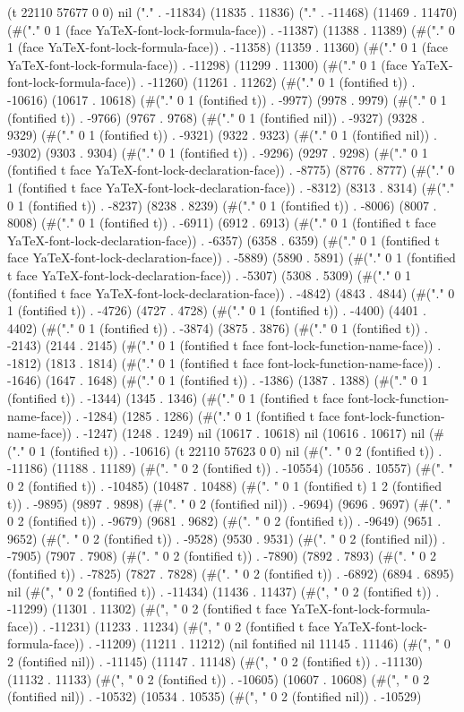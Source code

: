 (t 22110 57677 0 0) nil ("." . -11834) (11835 . 11836) ("." . -11468) (11469 . 11470) (#("." 0 1 (face YaTeX-font-lock-formula-face)) . -11387) (11388 . 11389) (#("." 0 1 (face YaTeX-font-lock-formula-face)) . -11358) (11359 . 11360) (#("." 0 1 (face YaTeX-font-lock-formula-face)) . -11298) (11299 . 11300) (#("." 0 1 (face YaTeX-font-lock-formula-face)) . -11260) (11261 . 11262) (#("." 0 1 (fontified t)) . -10616) (10617 . 10618) (#("." 0 1 (fontified t)) . -9977) (9978 . 9979) (#("." 0 1 (fontified t)) . -9766) (9767 . 9768) (#("." 0 1 (fontified nil)) . -9327) (9328 . 9329) (#("." 0 1 (fontified t)) . -9321) (9322 . 9323) (#("." 0 1 (fontified nil)) . -9302) (9303 . 9304) (#("." 0 1 (fontified t)) . -9296) (9297 . 9298) (#("." 0 1 (fontified t face YaTeX-font-lock-declaration-face)) . -8775) (8776 . 8777) (#("." 0 1 (fontified t face YaTeX-font-lock-declaration-face)) . -8312) (8313 . 8314) (#("." 0 1 (fontified t)) . -8237) (8238 . 8239) (#("." 0 1 (fontified t)) . -8006) (8007 . 8008) (#("." 0 1 (fontified t)) . -6911) (6912 . 6913) (#("." 0 1 (fontified t face YaTeX-font-lock-declaration-face)) . -6357) (6358 . 6359) (#("." 0 1 (fontified t face YaTeX-font-lock-declaration-face)) . -5889) (5890 . 5891) (#("." 0 1 (fontified t face YaTeX-font-lock-declaration-face)) . -5307) (5308 . 5309) (#("." 0 1 (fontified t face YaTeX-font-lock-declaration-face)) . -4842) (4843 . 4844) (#("." 0 1 (fontified t)) . -4726) (4727 . 4728) (#("." 0 1 (fontified t)) . -4400) (4401 . 4402) (#("." 0 1 (fontified t)) . -3874) (3875 . 3876) (#("." 0 1 (fontified t)) . -2143) (2144 . 2145) (#("." 0 1 (fontified t face font-lock-function-name-face)) . -1812) (1813 . 1814) (#("." 0 1 (fontified t face font-lock-function-name-face)) . -1646) (1647 . 1648) (#("." 0 1 (fontified t)) . -1386) (1387 . 1388) (#("." 0 1 (fontified t)) . -1344) (1345 . 1346) (#("." 0 1 (fontified t face font-lock-function-name-face)) . -1284) (1285 . 1286) (#("." 0 1 (fontified t face font-lock-function-name-face)) . -1247) (1248 . 1249) nil (10617 . 10618) nil (10616 . 10617) nil (#("." 0 1 (fontified t)) . -10616) (t 22110 57623 0 0) nil (#(". " 0 2 (fontified t)) . -11186) (11188 . 11189) (#(". " 0 2 (fontified t)) . -10554) (10556 . 10557) (#(". " 0 2 (fontified t)) . -10485) (10487 . 10488) (#(". " 0 1 (fontified t) 1 2 (fontified t)) . -9895) (9897 . 9898) (#(". " 0 2 (fontified nil)) . -9694) (9696 . 9697) (#(". " 0 2 (fontified t)) . -9679) (9681 . 9682) (#(". " 0 2 (fontified t)) . -9649) (9651 . 9652) (#(". " 0 2 (fontified t)) . -9528) (9530 . 9531) (#(". " 0 2 (fontified nil)) . -7905) (7907 . 7908) (#(". " 0 2 (fontified t)) . -7890) (7892 . 7893) (#(". " 0 2 (fontified t)) . -7825) (7827 . 7828) (#(". " 0 2 (fontified t)) . -6892) (6894 . 6895) nil (#(", " 0 2 (fontified t)) . -11434) (11436 . 11437) (#(", " 0 2 (fontified t)) . -11299) (11301 . 11302) (#(", " 0 2 (fontified t face YaTeX-font-lock-formula-face)) . -11231) (11233 . 11234) (#(", " 0 2 (fontified t face YaTeX-font-lock-formula-face)) . -11209) (11211 . 11212) (nil fontified nil 11145 . 11146) (#(", " 0 2 (fontified nil)) . -11145) (11147 . 11148) (#(", " 0 2 (fontified t)) . -11130) (11132 . 11133) (#(", " 0 2 (fontified t)) . -10605) (10607 . 10608) (#(", " 0 2 (fontified nil)) . -10532) (10534 . 10535) (#(", " 0 2 (fontified nil)) . -10529) 